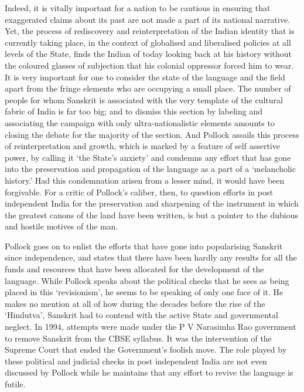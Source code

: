 Indeed, it is vitally important for a nation to be cautious in ensuring that exaggerated claims about its past are not made a part of its national narrative. Yet, the process of rediscovery and reinterpretation of the Indian identity that is currently taking place, in the context of globalised and liberalised policies at all levels of the State, finds the Indian of today looking back at his history without the coloured glasses of subjection that his colonial oppressor forced him to wear.  It is very important for one to consider the state of the language and the field apart from the fringe elements who are occupying a small place. The number of people for whom Sanskrit is associated with the very template of the cultural fabric of India is far too big; and to dismiss this section by labeling and associating the campaign with only ultra-nationalistic elements amounts to closing the debate for the majority of the section. And Pollock assails this process of reinterpretation and growth, which is marked by a feature of self assertive power, by calling it ‘the State’s anxiety’ and condemns any effort that has gone into the preservation and propagation of the language as a part of a ‘melancholic history.’ Had this condemnation arisen from a lesser mind, it would have been forgivable. For a critic of Pollock’s caliber, then, to question efforts in post independent India for the preservation and sharpening of the instrument in which the greatest canons of the land have been written, is but a pointer to the dubious and hostile motives of the man.

Pollock goes on to enlist the efforts that have gone into popularising Sanskrit since independence, and states that there have been hardly any results for all the funds and resources that have been allocated for the development of the language. While Pollock speaks about the political checks that he sees as being placed in this ‘revisionism’, he seems to be speaking of only one face of it. He makes no mention at all of how during the decades before the rise of the ‘Hindutva’, Sanskrit had to contend with the active State and governmental neglect. In 1994, attempts were made under the P V Narasimha Rao government to remove Sanskrit from the CBSE syllabus. It was the intervention of the Supreme Court that ended the Government’s foolish move. The role played by these political and judicial checks in post independent India are not even discussed by Pollock while he maintains that any effort to revive the language is futile.

